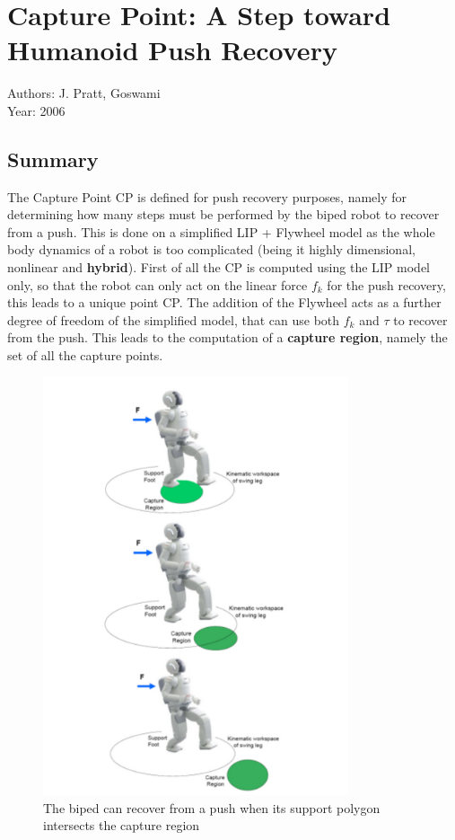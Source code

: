 \section{Capture Point: A Step toward Humanoid Push Recovery \cite{Pratt+CDG:2006}}
Authors: J. Pratt, Goswami\\
Year: 2006
\subsection*{Summary}
The Capture Point CP is defined for push recovery purposes, namely for determining how many steps must be performed by the biped robot to recover from a push. This is done on a simplified LIP +  Flywheel model as the whole body dynamics of a robot is too complicated (being it highly dimensional, nonlinear and \textbf{hybrid}). First of all the CP is computed using the LIP model only, so that the robot can only act on the linear force $f_k$ for the push recovery, this leads to a unique point CP. The addition of the Flywheel acts as a further degree of freedom of the simplified model, that can use both $f_k$ and $\tau$ to recover from the push. This leads to the computation of a \textbf{capture region}, namely the set of all the capture points.
\begin{figure}
  \centering
  \includegraphics[width=90mm]{CapturePoint}
  \caption{The biped can recover from a push when its support polygon intersects the capture region}
\end{figure}
